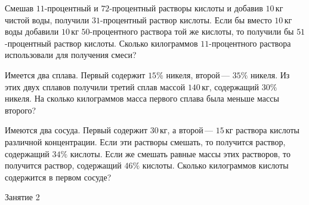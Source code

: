\begin{class}[number=1]
\begin{listofex}
		\item Смешав \(11\)-процентный и \(72\)-процентный растворы кислоты и добавив \(10\) кг чистой воды, получили \(31\)-процентный раствор кислоты. Если бы вместо \(10\) кг воды добавили \(10\) кг \(50\)-процентного раствора той же кислоты, то получили бы \(51\)-процентный раствор кислоты. Сколько килограммов \(11\)-процентного раствора использовали для получения смеси?
		
		\item Имеется два сплава. Первый содержит \(15\%\) никеля, второй --- \(35\%\) никеля. Из этих двух сплавов получили третий сплав массой \(140\) кг, содержащий \(30\%\) никеля. На сколько килограммов масса первого сплава была меньше массы второго?
		
		
		\item Имеются два сосуда. Первый содержит \(30\) кг, а второй --- \(15\) кг раствора кислоты различной концентрации. Если эти растворы смешать, то получится раствор, содержащий \(34\%\) кислоты. Если же смешать равные массы этих растворов, то получится раствор, содержащий \(46\%\) кислоты. Сколько килограммов кислоты содержится в первом сосуде?
	\end{listofex}
\end{class}

\begin{class}[number=2]
	\begin{listofex}
		\item Занятие 2
	\end{listofex}
\end{class}

